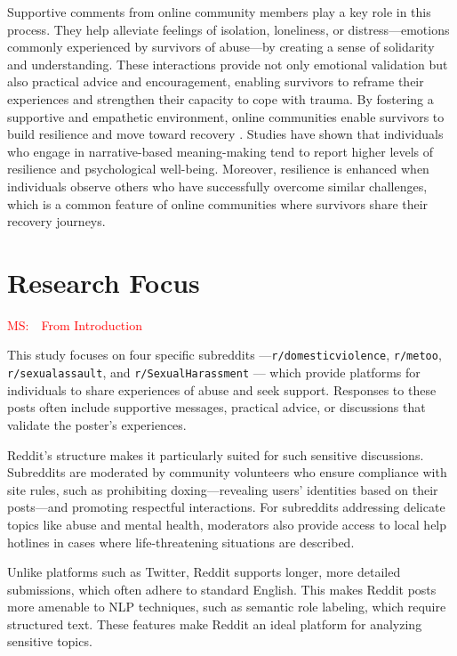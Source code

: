 \documentclass[11pt]{article}
\newcommand{\ms}[1]{\textcolor{red}{{MS:~~#1}}}
\begin{document}
Supportive comments from online community members play a key role in this process. 
They help alleviate feelings of isolation, loneliness, or distress—emotions commonly experienced by survivors of abuse—by creating a sense of solidarity and understanding. 
These interactions provide not only emotional validation but also practical advice and encouragement, enabling survivors to reframe their experiences and strengthen their capacity to cope with trauma. 
By fostering a supportive and empathetic environment, online communities enable survivors to build resilience and move toward recovery \citep{pendry2015individual}.
Studies have shown that individuals who engage in narrative-based meaning-making tend to report higher levels of resilience and psychological well-being. 
Moreover, resilience is enhanced when individuals observe others who have successfully overcome similar challenges, which is a common feature of online communities where survivors share their recovery journeys.


\section{Research Focus}

\ms{From Introduction}

This study focuses on four specific subreddits —\texttt{r/domesticviolence}, \texttt{r/metoo}, \texttt{r/sexualassault}, and \texttt{r/SexualHarassment} — which provide platforms for individuals to share experiences of abuse and seek support.  
Responses to these posts often include supportive messages, practical advice, or discussions that validate the poster's experiences.

Reddit's structure makes it particularly suited for such sensitive discussions. 
Subreddits are moderated by community volunteers who ensure compliance with site rules, such as prohibiting doxing—revealing users' identities based on their posts—and promoting respectful interactions. 
For subreddits addressing delicate topics like abuse and mental health, moderators also provide access to local help hotlines in cases where life-threatening situations are described.

Unlike platforms such as Twitter, Reddit supports longer, more detailed submissions, which often adhere to standard English. 
This makes Reddit posts more amenable to NLP techniques, such as semantic role labeling, which require structured text. 
These features make Reddit an ideal platform for analyzing sensitive topics.
\end{document}

